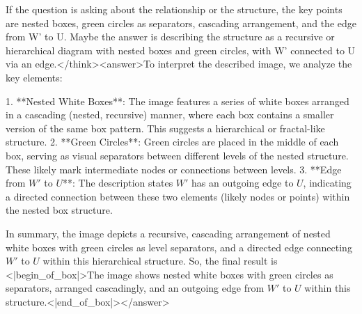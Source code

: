 If the question is asking about the relationship or the structure, the key points are nested boxes, green circles as separators, cascading arrangement, and the edge from W' to U. Maybe the answer is describing the structure as a recursive or hierarchical diagram with nested boxes and green circles, with W' connected to U via an edge.</think><answer>To interpret the described image, we analyze the key elements:  

1. **Nested White Boxes**: The image features a series of white boxes arranged in a cascading (nested, recursive) manner, where each box contains a smaller version of the same box pattern. This suggests a hierarchical or fractal-like structure.  
2. **Green Circles**: Green circles are placed in the middle of each box, serving as visual separators between different levels of the nested structure. These likely mark intermediate nodes or connections between levels.  
3. **Edge from \( W' \) to \( U \)**: The description states \( W' \) has an outgoing edge to \( U \), indicating a directed connection between these two elements (likely nodes or points) within the nested box structure.  

In summary, the image depicts a recursive, cascading arrangement of nested white boxes with green circles as level separators, and a directed edge connecting \( W' \) to \( U \) within this hierarchical structure.  
So, the final result is <|begin_of_box|>The image shows nested white boxes with green circles as separators, arranged cascadingly, and an outgoing edge from \( W' \) to \( U \) within this structure.<|end_of_box|></answer>